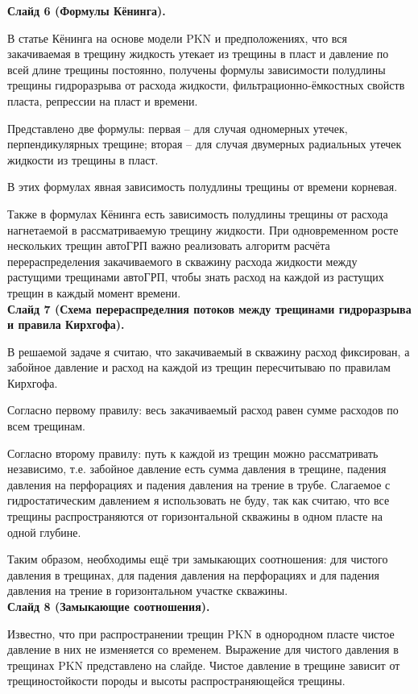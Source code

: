 \documentclass[a4paper, 12pt]{article}
\begin{document}
\textbf{Слайд 6 (Формулы Кёнинга).}

В статье Кёнинга на основе модели PKN и предположениях, что вся закачиваемая в трещину жидкость утекает из трещины в пласт и давление по всей длине трещины постоянно, получены формулы зависимости полудлины трещины гидроразрыва от расхода жидкости, фильтрационно-ёмкостных свойств пласта, репрессии на пласт и времени.

Представлено две формулы: первая -- для случая одномерных утечек, перпендикулярных трещине; вторая -- для случая двумерных радиальных утечек жидкости из трещины в пласт.

В этих формулах явная зависимость полудлины трещины от времени корневая.

Также в формулах Кёнинга есть зависимость полудлины трещины от расхода нагнетаемой в рассматриваемую трещину жидкости.
При одновременном росте нескольких трещин автоГРП важно реализовать алгоритм расчёта перераспределения закачиваемого в скважину расхода жидкости между растущими трещинами автоГРП, чтобы знать расход на каждой из растущих трещин в каждый момент времени.
\\

\textbf{Слайд 7 (Схема перераспределния потоков между трещинами гидроразрыва и правила Кирхгофа).}

В решаемой задаче я считаю, что закачиваемый в скважину расход фиксирован, а забойное давление и расход на каждой из трещин пересчитываю по правилам Кирхгофа.

Согласно первому правилу: весь закачиваемый расход равен сумме расходов по всем трещинам.

Согласно второму правилу: путь к каждой из трещин можно рассматривать независимо, т.е. забойное давление есть сумма давления в трещине, падения давления на перфорациях и падения давления на трение в трубе.
Слагаемое с гидростатическим давлением я использовать не буду, так как считаю, что все трещины распространяются от горизонтальной скважины в одном пласте на одной глубине.

Таким образом, необходимы ещё три замыкающих соотношения: для чистого давления в трещинах, для падения давления на перфорациях и для падения давления на трение в горизонтальном участке скважины.
\\


\textbf{Слайд 8 (Замыкающие соотношения).}

Известно, что при распространении трещин PKN в однородном пласте чистое давление в них не изменяется со временем.
Выражение для чистого давления в трещинах PKN представлено на слайде. Чистое давление в трещине зависит от трещиностойкости породы и высоты распространяющейся трещины.
\end{document}
